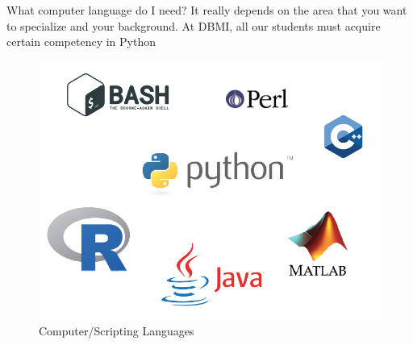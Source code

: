 \documentclass[11pt, aspectratio=43]{beamer}
\begin{document}
\begin{frame}{What computer language do I need?}
	It really depends on the area that you want to specialize and your
	background. At DBMI, all our students must acquire certain competency in
	Python
	\begin{figure}[h]
		\centering
		\includegraphics[scale=0.45]{Figures/languages.png}
		\caption{Computer/Scripting Languages}
	\end{figure}
	
\end{frame}
\end{document}
